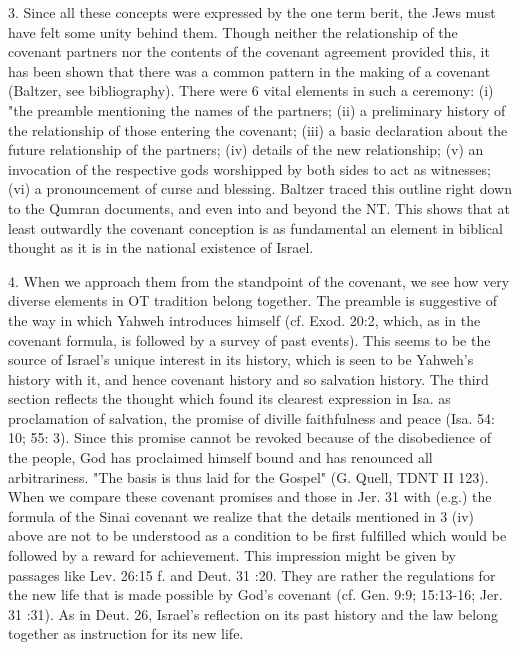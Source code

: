 				3. Since all these concepts were expressed by the one term berit, the Jews must have felt some unity behind them. Though neither the relationship of the covenant partners nor the contents of the covenant agreement provided this, it has been shown that there was a common pattern in the making of a covenant (Baltzer, see bibliography). There were 6 vital elements in such a ceremony: (i) "the preamble mentioning the names of the partners; (ii) a preliminary history of the relationship of those entering the covenant; (iii) a basic declaration about the future relationship of the partners; (iv) details of the new relationship; (v) an invocation of the respective gods worshipped by both sides to act as witnesses; (vi) a pronouncement of curse and blessing. Baltzer traced this outline right down to the Qumran documents, and even into and beyond the NT. This shows that at least outwardly the covenant conception is as fundamental an element in biblical thought as it is in the national existence of Israel. 

				4. When we approach them from the standpoint of the covenant, we see how very diverse elements in OT tradition belong together. The preamble is suggestive of the way in which Yahweh introduces himself (cf. Exod. 20:2, which, as in the covenant formula, is followed by a survey of past events). This seems to be the source of Israel's unique interest in its history, which is seen to be Yahweh's history with it, and hence covenant history and so salvation history. The third section reflects the thought which found its clearest expression in Isa. as proclamation of salvation, the promise of diville faithfulness and peace (Isa. 54: 10; 55: 3). Since this promise cannot be revoked because of the disobedience of the people, God has proclaimed himself bound and has renounced all arbitrariness. "The basis is thus laid for the Gospel" (G. Quell, TDNT II 123). When we compare these covenant promises and those in Jer. 31 with (e.g.) the formula of the Sinai covenant we realize that the details mentioned in 3 (iv) above are not to be understood as a condition to be first fulfilled which would be followed by a reward for achievement. This impression might be given by passages like Lev. 26:15 f. and Deut. 31 :20. They are rather the regulations for the new life that is made possible by God's covenant (cf. Gen. 9:9; 15:13-16; Jer. 31 :31). As in Deut. 26, Israel's reflection on its past history and the law belong together as instruction for its new life. 

